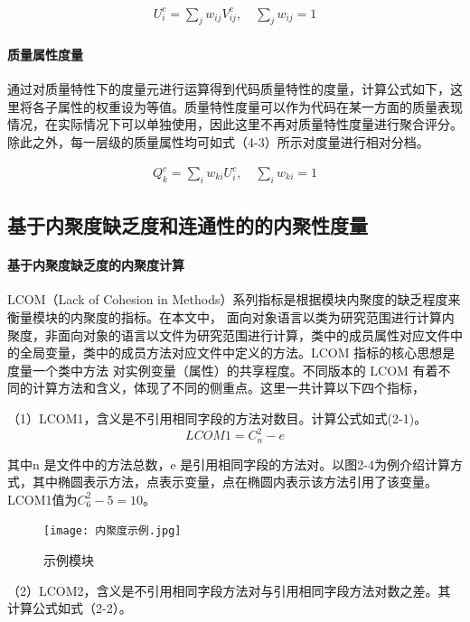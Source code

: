 \begin{align}
U_i^c = \sum_j w_{ij} V_{ij}^c, \quad \sum_j w_{ij} = 1
\end{align}

\paragraph{质量属性度量} 通过对质量特性下的度量元进行运算得到代码质量特性的度量，计算公式如下，这里将各子属性的权重设为等值。质量特性度量可以作为代码在某一方面的质量表现情况，在实际情况下可以单独使用，因此这里不再对质量特性度量进行聚合评分。除此之外，每一层级的质量属性均可如式（4-3）所示对度量进行相对分档。

\begin{align}
Q_k^c = \sum_i w_{ki} U_{i}^c, \quad \sum_i w_{ki} = 1
\end{align}

\subsection{基于内聚度缺乏度和连通性的的内聚性度量}

\paragraph{基于内聚度缺乏度的内聚度计算} LCOM（Lack of Cohesion in Methods）系列指标是根据模块内聚度的缺乏程度来衡量模块的内聚度的指标。在本文中，
面向对象语言以类为研究范围进行计算内聚度，非面向对象的语言以文件为研究范围进行计算，类中的成员属性对应文件中的全局变量，类中的成员方法对应文件中定义的方法。LCOM 指标的核心思想是度量一个类中方法
对实例变量（属性）的共享程度。不同版本的 LCOM 有着不同的计算方法和含义，体现了不同的侧重点。这里一共计算以下四个指标，

（1）LCOM1，含义是不引用相同字段的方法对数目\cite{1994Ametr}。计算公式如式(2-1)。
\begin{equation}
LCOM1 = C_{n}^{2}-e
\end{equation}

其中n 是文件中的方法总数，e 是引用相同字段的方法对。以图2-4为例介绍计算方式，其中椭圆表示方法，点表示变量，点在椭圆内表示该方法引用了该变量。LCOM1值为\(C_{6}^{2} - 5 = 10\)。

\begin{figure}[h]
\centering
\texttt{[image: 内聚度示例.jpg]}
\caption{示例模块}
\end{figure}
    

（2）LCOM2，含义是不引用相同字段方法对与引用相同字段方法对数之差\cite{1996Coupling}。其计算公式如式（2-2）。


